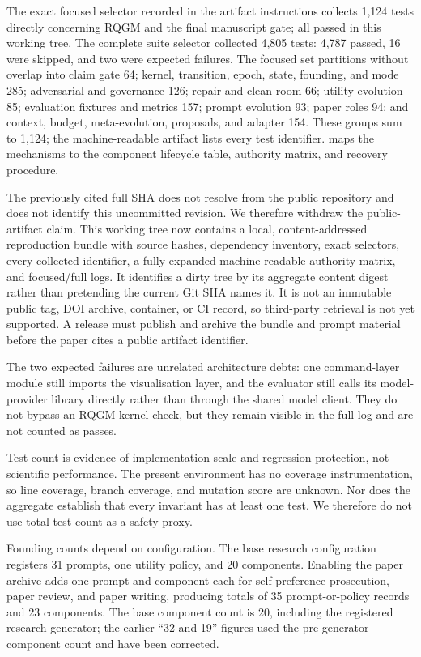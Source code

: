 The exact focused selector recorded in the artifact instructions collects
1,124 tests directly concerning RQGM and the final manuscript gate; all
passed in this working tree. The complete suite selector collected 4,805
tests: 4,787 passed, 16 were skipped, and two were expected failures.
The focused set partitions without overlap into claim gate 64;
kernel, transition, epoch, state, founding, and mode 285; adversarial and
governance 126; repair and clean room 66; utility evolution 85; evaluation
fixtures and metrics 157; prompt evolution 93; paper roles 94; and context,
budget, meta-evolution, proposals, and adapter 154. These groups sum to
1,124; the machine-readable artifact lists every test identifier.
 maps the mechanisms to the component
lifecycle table, authority matrix, and recovery procedure.

The previously cited full SHA does not resolve from the public repository
and does not identify this uncommitted revision. We therefore withdraw the
public-artifact claim. This working tree now contains a local,
content-addressed reproduction bundle with source hashes, dependency
inventory, exact selectors, every collected identifier, a fully expanded
machine-readable authority matrix, and focused/full logs. It identifies a
dirty tree by its aggregate content digest rather than
pretending the current Git SHA names it. It is not an immutable public tag,
DOI archive, container, or CI record, so third-party retrieval is not yet
supported. A release must publish and archive the bundle and prompt material
before the paper cites a public artifact identifier.

The two expected failures are unrelated architecture debts: one command-layer
module still imports the visualisation layer, and the evaluator still calls
its model-provider library directly rather than through the shared model
client. They do not bypass an RQGM kernel check, but they remain visible in
the full log and are not counted as passes.

Test count is evidence of implementation scale and regression protection,
not scientific performance. The present environment has no coverage
instrumentation, so line coverage, branch coverage, and mutation score are
unknown. Nor does the aggregate establish that every invariant has at
least one test. We therefore do not use total test count as a safety
proxy.

Founding counts depend on configuration. The base research configuration
registers 31 prompts, one utility policy, and 20 components. Enabling the
paper archive adds one prompt and component each for self-preference
prosecution, paper review, and paper writing, producing totals of 35
prompt-or-policy records and 23 components. The base component count is 20,
including the registered research generator; the earlier ``32 and 19''
figures used the pre-generator component count and have been corrected.

